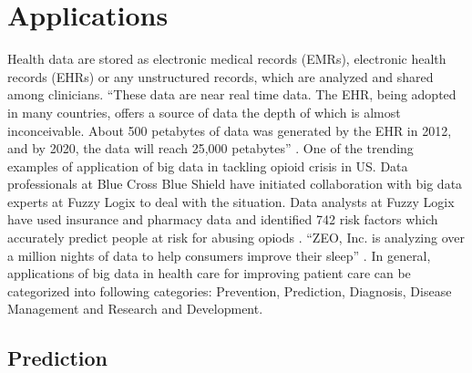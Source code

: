 \documentclass[sigconf]{acmart}
\begin{document}
\section{Applications}
Health data are stored as electronic medical records (EMRs), electronic health records (EHRs) or any unstructured records, which are 
analyzed and shared among clinicians. ``These data are near real time data. 
The EHR, being adopted in many countries, offers a source 
of data the depth of which is almost inconceivable. About 500 petabytes of data 
was generated by the EHR in 2012, and by 2020, the 
data will reach 25,000 petabytes'' \cite{www-ghdonline-org}. One of the trending examples of application of big data in tackling 
opioid crisis in US.
Data professionals at Blue Cross Blue Shield have initiated collaboration with big data experts at Fuzzy Logix to deal with the situation. Data analysts at Fuzzy Logix have used
insurance and pharmacy data and identified 742 risk factors which accurately predict people at risk for abusing opiods \cite{www-datapine-com}. ``ZEO, Inc. is analyzing over a million 
nights of data to help consumers improve their sleep'' \cite{www-ghdonline-org}.
In general, applications of big data in health care for improving patient care can be categorized into following categories: 
Prevention, Prediction, Diagnosis, Disease Management and Research and Development.

\subsection{Prediction}
\end{document}
